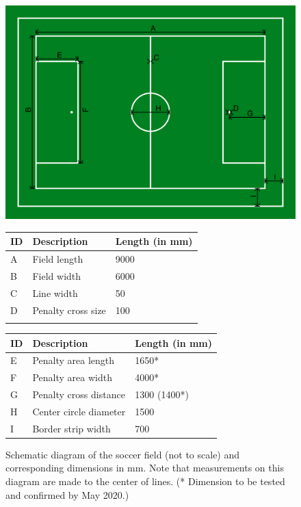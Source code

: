 \documentclass[12pt]{article}
\begin{document}
\begin{figure}[b!]
\centering
\centerline{\includegraphics[width=\columnwidth]{figs/fieldDimensions2020.pdf}}
\vspace{1ex}
\begin{tabular}{| l | l | l |}
ID & Description & Length (in mm) \\
\hline
A & Field length & 9000 \\
\hline
B & Field width & 6000 \\
\hline
C & Line width & 50 \\
\hline
D & Penalty cross size & 100 \\
\hline
 &  &  \\
\end{tabular}
\begin{tabular}{|l|l|l|}
ID & Description & Length (in mm) \\
\hline
E & Penalty area length & 1650* \\
\hline
F & Penalty area width & 4000* \\
\hline
G & Penalty cross distance & 1300 (1400*) \\
\hline
H & Center circle diameter & 1500 \\
\hline
I & Border strip width & 700 \\
\end{tabular}
\caption{Schematic diagram of the soccer field (not to scale) and corresponding dimensions in mm.  Note that measurements on this diagram are made to the center of lines. 
(* Dimension to be tested and confirmed by May 2020.)} \label{fig:field_dim}
\end{figure}
\end{document}
